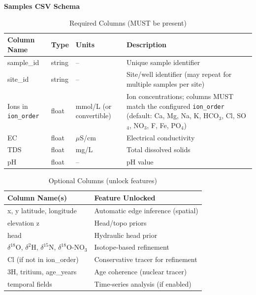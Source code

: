 \documentclass[12pt,a4paper]{article}
\theoremstyle{plain}
\theoremstyle{definition}
\theoremstyle{remark}
\begin{document}
\textbf{Samples CSV Schema}

\begin{table}[htbp]
\caption{Required Columns (MUST be present)}
\begin{tabularx}{\textwidth}{@{} l l l X @{}}
	\toprule
Column Name & Type & Units & Description \\
\midrule
sample\_id & string & -- & Unique sample identifier \\
site\_id & string & -- & Site/well identifier (may repeat for multiple samples per site) \\
Ions in \texttt{ion\_order} & float & mmol/L (or convertible) & Ion concentrations; columns MUST match the configured \texttt{ion\_order} (default: Ca, Mg, Na, K, HCO$_3$, Cl, SO$_4$, NO$_3$, F, Fe, PO$_4$) \\
EC & float & $\mu$S/cm & Electrical conductivity \\
TDS & float & mg/L & Total dissolved solids \\
pH & float & -- & pH value \\
\bottomrule
\end{tabularx}
\end{table}

\begin{table}[htbp]
\caption{Optional Columns (unlock features)}
\begin{tabularx}{\textwidth}{@{} l X @{}}
	\toprule
Column Name(s) & Feature Unlocked \\
\midrule
x, y \textbar{} latitude, longitude & Automatic edge inference (spatial) \\
elevation \textbar{} z & Head/topo priors \\
head & Hydraulic head prior \\
$\delta^{18}$O, $\delta^2$H, $\delta^{15}$N, $\delta^{18}$O-NO$_3$ & Isotope-based refinement \\
Cl (if not in ion\_order) & Conservative tracer for refinement \\
3H, tritium, age\_years & Age coherence (nuclear tracer) \\
temporal fields & Time-series analysis (if enabled) \\
\bottomrule
\end{tabularx}
\end{table}
\end{document}
